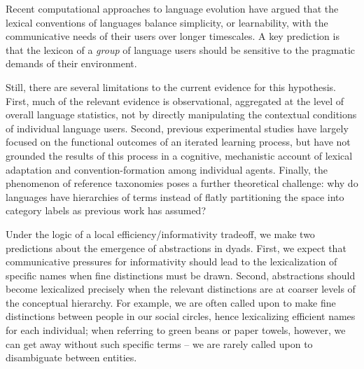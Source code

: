Recent computational approaches to language evolution have argued that the lexical conventions of languages balance simplicity, or learnability, with the communicative needs of their users over longer timescales. 
A key prediction is that the lexicon of a \emph{group} of language users should be sensitive to the pragmatic demands of their environment. 

Still, there are several limitations to the current evidence for this hypothesis. 
First, much of the relevant evidence is observational, aggregated at the level of overall language statistics, not by directly manipulating the contextual conditions of individual language users. 
Second, previous experimental studies have largely focused on the functional outcomes of an iterated learning process, %
but have not grounded the results of this process in a cognitive, mechanistic account of lexical adaptation and convention-formation among individual agents. 
Finally, the phenomenon of reference taxonomies poses a further theoretical challenge: why do languages have hierarchies of terms instead of flatly partitioning the space into category labels as previous work has assumed?


Under the logic of a local efficiency/informativity tradeoff, we make two predictions about the emergence of abstractions in dyads. 
First, we expect that communicative pressures for informativity should lead to the lexicalization of specific names when fine distinctions must be drawn. 
Second, abstractions should become lexicalized precisely when the relevant distinctions are at coarser levels of the conceptual hierarchy. 
For example, we are often called upon to make fine distinctions between people in our social circles, hence lexicalizing efficient names for each individual; when referring to green beans or paper towels, however, we can get away without such specific terms -- we are rarely called upon to disambiguate between entities. %

